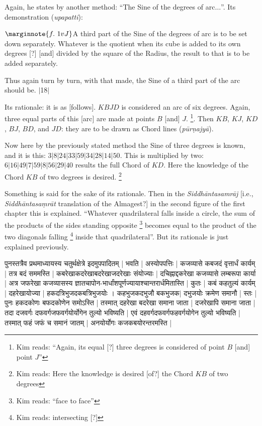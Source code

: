 \documentclass[12pt]{book}
\let\*=\d
\def\purnajya{\textit{p\=ur\*najy\=a}}
\def\elp{$\ldots$}
\def\danda{$|$}
\begin{document}
\newpage


Again, he states by another method: ``The Sine of the degrees of arc\elp''. Its demonstration (\textit{upapatti}):

$\marginnote{f.~1v J}$A third part of the Sine of the degrees of arc is to be set down separately. Whatever
is the quotient when its cube
is added to its own degrees [?] [and] divided by the square of the Radius, the result
to  that is to be added separately. 

Thus again turn by turn, with that made, the Sine of a third part of the arc should be. \danda18\danda

Its rationale: it is as [follows]. $KBJD$ is considered an arc of six degrees. 
Again, three equal parts of this [arc] are made at points $B$ [and] $J$. \footnote{Kim reads: ``Again, its equal [?] three degrees is considered of point $B$ [and] point $J$''}.
Then $KB$, $KJ$, $KD$, $BJ$, $BD$, and $JD$: they are to be drawn as
Chord lines (\purnajya). 

Now here by the previously stated method the Sine of three degrees is known, 
and it is this:  $3|8|24|33|59|34|28|14|50$. This is multiplied by two:
$6|16|49|7|59|8|56|29|40$ results the full Chord of $KD$. Here the knowledge
of the Chord $KB$ of two degrees is desired. \footnote{Kim reads: Here the knowledge is desired [of?] the Chord $KB$ of two degrees}

Something is said for the sake of its rationale. Then  in the 
\textit{Siddh\=anta\-samr\=aj} [i.e., \textit{Siddh\=antasa\*mr\=at} translation
of the Almagest?] in the second figure of the first chapter this is
explained.  ``Whatever quadrilateral falls inside a circle, the sum of the 
products of the sides standing opposite \footnote{Kim reads: ``face to face''} becomes equal to the
product of the two diagonals falling \footnote{Kim reads: intersecting [?]} inside that quadrilateral''.
But its rationale is just explained previously. 

\newpage 


{\s पुनस्तत्रैव प्रथ\-माध्यायस्य चतुर्थक्षेत्रे इदमुपपादितम् |
%
{
} 
 भवति |
अस्योपपत्तिः |
कजव्यासे कबजदं वृत्तार्धं कार्यम् |
तत्र बदं 
सममस्ति |
कबरेखाकदरेखा\-बदरेखा\-जदरेखाः संयोज्याः |
दचिह्नाद्दकरेखा कजव्यासे लम्बरूपा कार्या |
अत्र जफरेखा कजव्यासस्य ज्ञातचापोन-भार्धांशपूर्णज्यायाश्चान्तरार्धमितास्ति |
कुतः |
कबं कहतुल्यं कार्यम् |
दहरेखायोज्या |
हकदत्रिभुज\-दकबत्रिभुजयोः ।
कहभुजकदभुजौ बकभुजक$|$%
दभुजयोः
क्रमेण समानौ | स्तः | पुनः हकदकोणः बफदकोणेन समोऽस्ति | तस्मात् दहरेखा बदरेखा समाना जाता | दजरेखापि समाना जाता | तदा दजवर्गः दफवर्गजफवर्गयोर्योगेन तुल्यो भविष्यति |
एवं दहवर्गदफवर्गफहवर्गयोगेन तुल्यो भविष्यति |
तस्मात् फहं जफं च समानं जातम् | अनयोर्योगः कजकबयोरन्तरमस्ति |} \\
\end{document}
